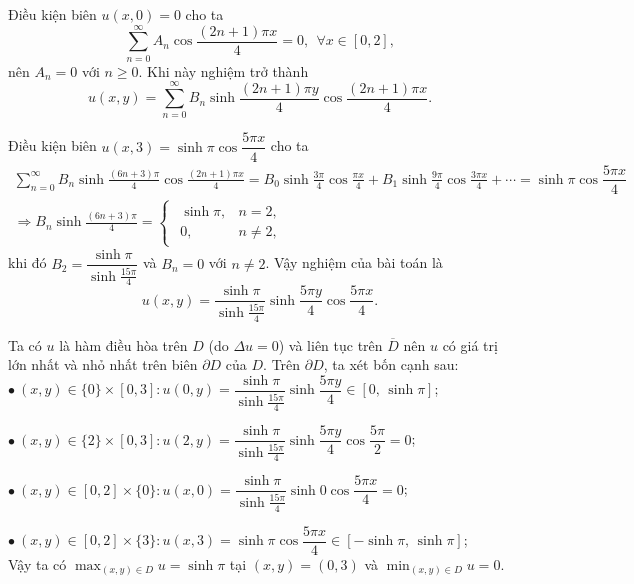 \documentclass[10pt, a4paper]{article}
\begin{document}
	Điều kiện biên $u(x,0)=0$ cho ta $$\sum_{n=0}^\infty A_n\cos\frac{(2n+1)\pi x}{4}=0,~~\forall x\in[0,2],$$
	nên $A_n=0$ với $n\ge0$. Khi này nghiệm trở thành $$u(x,y)=\sum_{n=0}^\infty B_n\sinh\frac{(2n+1)\pi y}{4}\cos\frac{(2n+1)\pi x}{4}.$$
	
	Điều kiện biên $u(x,3)=\sinh\pi\cos\dfrac{5\pi x}{4}$ cho ta \begin{gather*}
		\sum_{n=0}^\infty B_n\sinh\frac{(6n+3)\pi}{4}\cos\frac{(2n+1)\pi x}{4}=B_0\sinh\frac{3\pi}{4}\cos\frac{\pi x}{4}+B_1\sinh\frac{9\pi}{4}\cos\frac{3\pi x}{4}+\cdots=\sinh\pi\cos\dfrac{5\pi x}{4}\\
		\Rightarrow B_n\sinh\frac{(6n+3)\pi}{4}=\begin{cases}
			\begin{array}{ll}
				\sinh\pi, & n=2, \\
				0, & n\ne2,
			\end{array}
		\end{cases}
	\end{gather*}
	khi đó $B_2=\dfrac{\sinh\pi}{\sinh\frac{15\pi}{4}}$ và $B_n=0$ với $n\ne2$. Vậy nghiệm của bài toán là $$u(x,y)=\dfrac{\sinh\pi}{\sinh\frac{15\pi}{4}}\sinh\frac{5\pi y}{4}\cos\frac{5\pi x}{4}.$$
	
	Ta có $u$ là hàm điều hòa trên $D$ (do $\Delta u=0$) và liên tục trên $\overline D$ nên $u$ có giá trị lớn nhất và nhỏ nhất trên biên $\partial D$ của $D$. Trên $\partial D$, ta xét bốn cạnh sau:\\
	
	\quad$\bullet~(x,y)\in\{0\}\times[0,3]\colon u(0,y)=\dfrac{\sinh\pi}{\sinh\frac{15\pi}{4}}\sinh\dfrac{5\pi y}{4}\in\left[0,\,\sinh\pi\right]$;\vskip7pt
	
	\quad$\bullet~(x,y)\in\{2\}\times[0,3]\colon u(2,y)=\dfrac{\sinh\pi}{\sinh\frac{15\pi}{4}}\sinh\dfrac{5\pi y}{4}\cos\dfrac{5\pi}{2}=0$;\vskip7pt
	
	\quad$\bullet~(x,y)\in[0,2]\times\{0\}\colon u(x,0)=\dfrac{\sinh\pi}{\sinh\frac{15\pi}{4}}\sinh0\cos\dfrac{5\pi x}{4}=0$;\vskip7pt
	
	\quad$\bullet~(x,y)\in[0,2]\times\{3\}\colon u(x,3)=\sinh\pi\cos\dfrac{5\pi x}{4}\in\left[-\sinh\pi,\,\sinh\pi\right]$;\\
	
	Vậy ta có $\displaystyle\max_{(x,y)\in D}u=\sinh\pi$ tại $(x,y)=(0,3)$ và $\displaystyle\min_{(x,y)\in D}u=0$.
\end{document}
